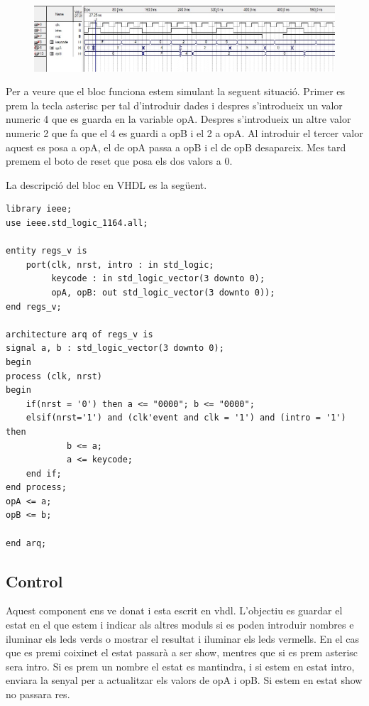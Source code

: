 \documentclass[12pt, a4papre]{article}
\begin{document}
	\begin{figure}[H]
		\begin{center}
		\includegraphics[width=130mm]{SimRegs.jpeg}
		\end{center}
	\end{figure}
	
	Per a veure que el bloc funciona estem simulant la seguent situació. Primer es prem la tecla asterisc per tal d'introduir dades i despres s'introdueix un valor numeric 4 que es guarda en la variable opA. Despres s'introdueix un altre valor numeric 2 que fa que el 4 es guardi a opB i el 2 a opA. Al introduir el tercer valor aquest es posa a opA, el de opA passa a opB i el de opB desapareix. Mes tard premem el boto de reset que posa els dos valors a 0.
	
	La descripció del bloc en VHDL es la següent.
	
	\begin{lstlisting}[style=vhdl, frame=single, basicstyle=\tiny]
library ieee;
use ieee.std_logic_1164.all;

entity regs_v is
	port(clk, nrst, intro : in std_logic;
		 keycode : in std_logic_vector(3 downto 0);
		 opA, opB: out std_logic_vector(3 downto 0));
end regs_v;

architecture arq of regs_v is
signal a, b : std_logic_vector(3 downto 0);
begin
process (clk, nrst)
begin 
	if(nrst = '0') then a <= "0000"; b <= "0000";
	elsif(nrst='1') and (clk'event and clk = '1') and (intro = '1') then
			b <= a;
			a <= keycode;
	end if;
end process;
opA <= a;
opB <= b;

end arq;
\end{lstlisting}
	
	\subsection{Control}
	
	Aquest component ens ve donat i esta escrit en vhdl. L'objectiu es guardar el estat en el que estem i indicar als altres moduls si es poden introduir nombres e iluminar els leds verds o mostrar el resultat i iluminar els leds vermells. En el cas que es premi coixinet el estat passarà a ser show, mentres que si es prem asterisc sera intro. Si es prem un nombre el estat es mantindra, i si estem en estat intro, enviara la senyal per a actualitzar els valors de opA i opB. Si estem en estat show no passara res.
	
\end{document}
